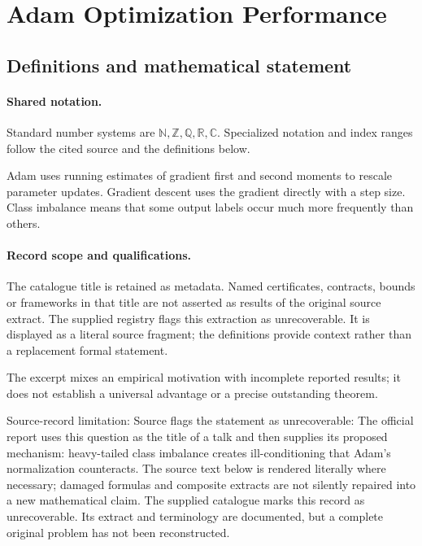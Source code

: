 \documentclass[11pt]{article}
\begin{document}
\section{Adam Optimization Performance}\label{statement}

\subsection{Definitions and mathematical statement}

\paragraph{Shared notation.}Standard number systems are $\mathbb N,\mathbb Z,\mathbb Q,\mathbb R,\mathbb C$. Specialized notation and index ranges follow the cited source and the definitions below.


Adam uses running estimates of gradient first and second moments to rescale parameter updates. Gradient descent uses the gradient directly with a step size. Class imbalance means that some output labels occur much more frequently than others.
\paragraph{Record scope and qualifications.}
The catalogue title is retained as metadata. Named certificates, contracts, bounds or frameworks in that title are not asserted as results of the original source extract.
The supplied registry flags this extraction as unrecoverable. It is displayed as a literal source fragment; the definitions provide context rather than a replacement formal statement.

The excerpt mixes an empirical motivation with incomplete reported results; it does not establish a universal advantage or a precise outstanding theorem.

Source-record limitation: Source flags the statement as unrecoverable: The official report uses this question as the title of a talk and then supplies its proposed mechanism: heavy-tailed class imbalance creates ill-conditioning that Adam’s normalization counteracts.
The source text below is rendered literally where necessary; damaged formulas and composite extracts are not silently repaired into a new mathematical claim.
The supplied catalogue marks this record as unrecoverable. Its extract and terminology are documented, but a complete original problem has not been reconstructed.
\end{document}
